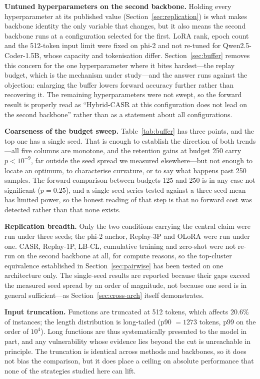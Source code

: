 \textbf{Untuned hyperparameters on the second backbone.} Holding every hyperparameter at its published value (Section~\ref{sec:replication}) is what makes backbone identity the only variable that changes, but it also means the second backbone runs at a configuration selected for the first. LoRA rank, epoch count and the 512-token input limit were fixed on phi-2 and not re-tuned for Qwen2.5-Coder-1.5B, whose capacity and tokenisation differ. Section~\ref{sec:buffer} removes this concern for the one hyperparameter where it bites hardest---the replay budget, which is the mechanism under study---and the answer runs against the objection: enlarging the buffer lowers forward accuracy further rather than recovering it. The remaining hyperparameters were not swept, so the forward result is properly read as ``Hybrid-CASR at this configuration does not lead on the second backbone'' rather than as a statement about all configurations.

\textbf{Coarseness of the budget sweep.} Table~\ref{tab:buffer} has three points, and the top one has a single seed. That is enough to establish the direction of both trends---all five columns are monotone, and the retention gains at budget 250 carry $p<10^{-9}$, far outside the seed spread we measured elsewhere---but not enough to locate an optimum, to characterise curvature, or to say what happens past 250 samples. The forward comparison between budgets 125 and 250 is in any case not significant ($p=0.25$), and a single-seed series tested against a three-seed mean has limited power, so the honest reading of that step is that no forward cost was detected rather than that none exists.

\textbf{Replication breadth.} Only the two conditions carrying the central claim were run under three seeds; the phi-2 anchor, Replay-3P and OLoRA were run under one. CASR, Replay-1P, LB-CL, cumulative training and zero-shot were not re-run on the second backbone at all, for compute reasons, so the top-cluster equivalence established in Section~\ref{sec:pairwise} has been tested on one architecture only. The single-seed results are reported because their gaps exceed the measured seed spread by an order of magnitude, not because one seed is in general sufficient---as Section~\ref{sec:cross-arch} itself demonstrates.


\textbf{Input truncation.} Functions are truncated at 512 tokens, which affects $20.6\%$ of instances; the length distribution is long-tailed (p90 $=1273$ tokens, p99 on the order of $10^4$). Long functions are thus systematically presented to the model in part, and any vulnerability whose evidence lies beyond the cut is unreachable in principle. The truncation is identical across methods and backbones, so it does not bias the comparison, but it does place a ceiling on absolute performance that none of the strategies studied here can lift.


